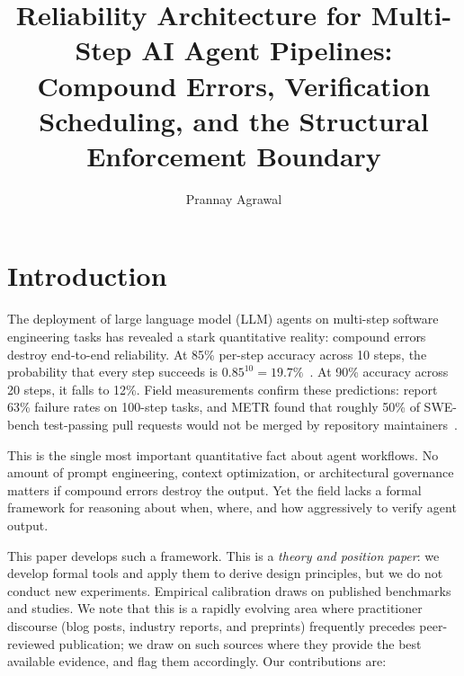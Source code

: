 \documentclass[11pt, a4paper, logo, copyright]{googledeepmind}
\title{Reliability Architecture for Multi-Step AI Agent Pipelines: Compound Errors, Verification Scheduling, and the Structural Enforcement Boundary}
\author[1]{Prannay Agrawal}
\begin{document}
\maketitle

\section{Introduction}
\label{sec:intro}

The deployment of large language model (LLM) agents on multi-step software engineering tasks has revealed a stark quantitative reality: compound errors destroy end-to-end reliability.
At 85\% per-step accuracy across 10 steps, the probability that every step succeeds is $0.85^{10} = 19.7\%$~\citep{rajan2026math}.
At 90\% accuracy across 20 steps, it falls to 12\%.
Field measurements confirm these predictions: \citet{hariharan2025plan} report 63\% failure rates on 100-step tasks, and METR found that roughly 50\% of SWE-bench test-passing pull requests would not be merged by repository maintainers~\citep{metr2026swebench}.

This is the single most important quantitative fact about agent workflows.
No amount of prompt engineering, context optimization, or architectural governance matters if compound errors destroy the output.
Yet the field lacks a formal framework for reasoning about when, where, and how aggressively to verify agent output.

This paper develops such a framework. This is a \emph{theory and position paper}: we develop formal tools and apply them to derive design principles, but we do not conduct new experiments. Empirical calibration draws on published benchmarks and studies. We note that this is a rapidly evolving area where practitioner discourse (blog posts, industry reports, and preprints) frequently precedes peer-reviewed publication; we draw on such sources where they provide the best available evidence, and flag them accordingly. Our contributions are:
\end{document}
